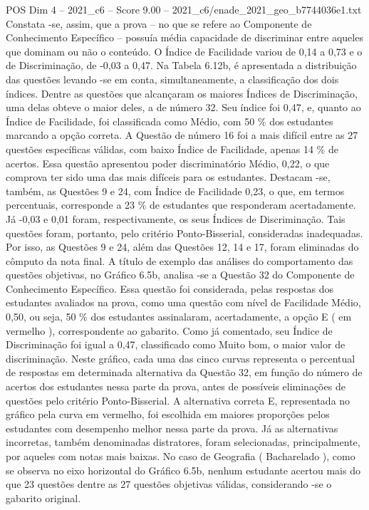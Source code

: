 \begin{textsample}{POS Dim 4 – 2021\_c6 – Score 9.00 – 2021\_c6/enade\_2021\_geo\_b7744036e1.txt}
Constata -se, assim, que a prova – no que se refere ao Componente de Conhecimento Específico – possuía média capacidade de discriminar entre aqueles que dominam ou não o conteúdo.
O Índice de Facilidade variou de 0,14 a 0,73 e o de Discriminação, de -0,03 a 0,47.
Na Tabela 6.12b, é apresentada a distribuição das questões levando -se em conta, simultaneamente, a classificação dos dois índices.
Dentre as questões que alcançaram os maiores Índices de Discriminação, uma delas obteve o maior deles, a de número 32.
Seu índice foi 0,47, e, quanto ao Índice de Facilidade, foi classificada como Médio, com 50 \% dos estudantes marcando a opção correta.
A Questão de número 16 foi a mais difícil entre as 27 questões específicas válidas, com baixo Índice de Facilidade, apenas 14 \% de acertos.
Essa questão apresentou poder discriminatório Médio, 0,22, o que comprova ter sido uma das mais difíceis para os estudantes.
Destacam -se, também, as Questões 9 e 24, com Índice de Facilidade 0,23, o que, em termos percentuais, corresponde a 23 \% de estudantes que responderam acertadamente.
Já -0,03 e 0,01 foram, respectivamente, os seus Índices de Discriminação.
Tais questões foram, portanto, pelo critério Ponto-Bisserial, consideradas inadequadas.
Por isso, as Questões 9 e 24, além das Questões 12, 14 e 17, foram eliminadas do cômputo da nota final.
A título de exemplo das análises do comportamento das questões objetivas, no Gráfico 6.5b, analisa -se a Questão 32 do Componente de Conhecimento Específico.
Essa questão foi considerada, pelas respostas dos estudantes avaliados na prova, como uma questão com nível de Facilidade Médio, 0,50, ou seja, 50 \% dos estudantes assinalaram, acertadamente, a opção E ( em vermelho ), correspondente ao gabarito.
Como já comentado, seu Índice de Discriminação foi igual a 0,47, classificado como Muito bom, o maior valor de discriminação.
Neste gráfico, cada uma das cinco curvas representa o percentual de respostas em determinada alternativa da Questão 32, em função do número de acertos dos estudantes nessa parte da prova, antes de possíveis eliminações de questões pelo critério Ponto-Bisserial.
A alternativa correta E, representada no gráfico pela curva em vermelho, foi escolhida em maiores proporções pelos estudantes com desempenho melhor nessa parte da prova.
Já as alternativas incorretas, também denominadas distratores, foram selecionadas, principalmente, por aqueles com notas mais baixas.
No caso de Geografia ( Bacharelado ), como se observa no eixo horizontal do Gráfico 6.5b, nenhum estudante acertou mais do que 23 questões dentre as 27 questões objetivas válidas, considerando -se o gabarito original.

\end{textsample}
